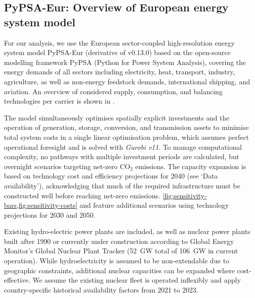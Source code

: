 

\subsection*{PyPSA-Eur: Overview of European energy system model}
\label{sec:methods-overview}

For our analysis, we use the European sector-coupled high-resolution energy
system model PyPSA-Eur\cite{horschPyPSAEurOpen2018a} (derivative of v0.13.0) based on the open-source
modelling framework PyPSA\cite{brownPyPSAPython2018} (Python for Power System
Analysis), covering the energy demands of all sectors including electricity,
heat, transport, industry, agriculture, as well as non-energy feedstock demands,
international shipping, and aviation. An overview of considered supply,
consumption, and balancing technologies per carrier is shown in
.

The model simultaneously optimises spatially explicit investments and the
operation of generation, storage, conversion, and transmission assets to
minimise total system costs in a single linear optimisation problem, which
assumes perfect operational foresight and is solved with \textit{Gurobi
v11}.\cite{gurobi} To manage computational complexity, no pathways with multiple
investment periods are calculated, but overnight scenarios targeting net-zero
CO$_2$ emissions. The capacity expansion is based on technology cost and
efficiency projections for 2040 (see `Data availability'), acknowledging that
much of the required infrastructure must be constructed well before reaching
net-zero emissions. \cref{fig:sensitivity-bars,fig:sensitivity-costs} and
 feature additional scenarios using technology
projections for 2030 and 2050.

Existing hydro-electric power plants\cite{gotzensPerformingEnergy2019} are
included, as well as nuclear power plants built after 1990 or currently under
construction according to Global Energy Monitor's Global Nuclear Plant Tracker
(52~GW total of 106~GW in current
operation).\cite{globalenergymonitorGlobalNuclearPower2024} While
hydroelectricity is assumed to be non-extendable due to geographic constraints,
additional nuclear capacities can be expanded where cost-effective. We assume
the existing nuclear fleet is operated inflexibly and apply country-specific
historical availability factors from 2021 to
2023.\cite{internationalatomicenergyagencyPowerReactorInformation2024}

